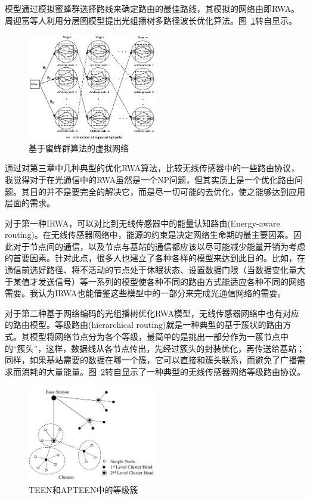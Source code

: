 \documentclass[11pt,twocolumn]{ctexart}
\begin{document}
模型通过模拟蜜蜂群选择路线来确定路由的最佳路线，其模拟的网络由即RWA。周迎富等人利用分层图模型提出光组播树多路径波长优化算法。图~\ref{BCO}转自\cite{6}显示。
\begin{figure}[!hbtp]
  \begin{center}
  \includegraphics[width=0.5\textwidth]{BCO}
  \end{center}
  \caption{基于蜜蜂群算法的虚拟网络}
  \label{BCO}
\end{figure}


通过对第三章中几种典型的优化RWA算法，比较无线传感器中的一些路由协议，我觉得对于在光通信中的RWA虽然是一个NP问题，但其实质上是一个优化路由问题。其目的并不是要完全的解决它，而是尽一切可能的去优化，使之能够达到应用层面的需求。

对于第一种IRWA，可以对比到无线传感器中的能量认知路由(Energy-aware routing)。在无线传感器网络中，能源的约束是决定网络生命期的最主要因素。因此对于节点间的通信，以及节点与基站的通信都应该以尽可能减少能量开销为考虑的首要因素。针对此点，很多人也建立了各种各样的模型来达到此目的。比如，在通信前选好路径、将不活动的节点处于休眠状态、设置数据门限（当数据变化量大于某值才发送信号）等一系列的模型使各种不同的路由方式能适应各种不同的网络需要。我认为IRWA也能借鉴这些模型中的一部分来完成光通信网络的需要。

对于第二种基于网络编码的光组播树优化RWA模型，无线传感器网络中也有对应的路由模型。等级路由(hierarchical routing)就是一种典型的基于簇状的路由方式。其模型将网络节点分为各个等级，最简单的是挑出一部分作为一簇节点中的“簇头”，这样，数据线从各节点传出，先经过簇头的封装优化，再传送给基站；同样，如果基站需要的数据在哪一个簇，它可以直接和簇头联系，而避免了广播需求而消耗的大量能量。图~\ref{TEEN}转自\cite{11}显示了一种典型的无线传感器网络等级路由协议。
\begin{figure}[!hbtp]
  \begin{center}
  \includegraphics[width=0.5\textwidth]{TEEN}
  \end{center}
  \caption{TEEN和APTEEN中的等级簇}
  \label{TEEN}
\end{figure}
\end{document}
